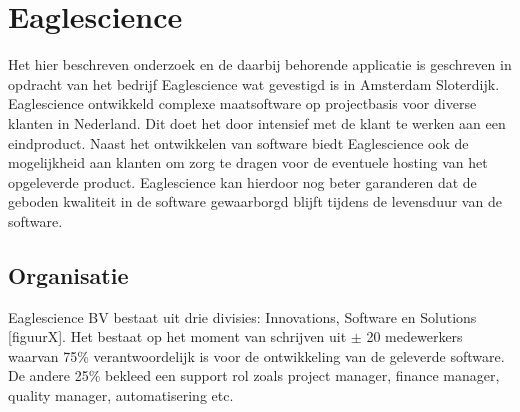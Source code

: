 \chapter{Eaglescience}\label{ch:eaglescience} %

\label{ch:Eaglescience} %


Het hier beschreven onderzoek en de daarbij behorende applicatie is geschreven in opdracht van het bedrijf Eaglescience wat gevestigd is in Amsterdam Sloterdijk.
Eaglescience ontwikkeld complexe maatsoftware op projectbasis voor diverse klanten in Nederland. Dit doet het door intensief met de klant te werken aan een eindproduct.
Naast het ontwikkelen van software biedt Eaglescience ook de mogelijkheid aan klanten om zorg te dragen voor de eventuele hosting van het opgeleverde product.
Eaglescience kan hierdoor nog beter garanderen dat de geboden kwaliteit in de software gewaarborgd blijft tijdens de levensduur van de software.

\section{Organisatie}\label{sec:organisatie}

Eaglescience BV bestaat uit drie divisies: Innovations, Software en Solutions [figuurX].%
Het bestaat op het moment van schrijven uit $\pm$ 20 medewerkers waarvan 75\% verantwoordelijk is voor de ontwikkeling van de geleverde software.
De andere 25\% bekleed een support rol zoals project manager, finance manager, quality manager, automatisering etc.

